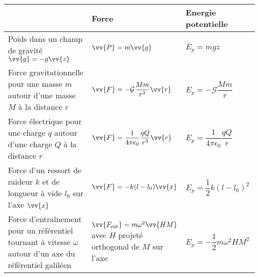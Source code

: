 \documentclass[a4paper]{article}
\begin{document}
\pagestyle{fancy}
\fancyhf{}
\setlength{\headheight}{15pt}

\begin{center}
	\large{}
\end{center}


\setlength{\tabcolsep}{10pt}
\renewcommand{\arraystretch}{1.5}
\begin{table}[h]
\begin{tabular}{p{0.4\linewidth}|p{0.3\linewidth}|p{0.3\linewidth}} 
                       & Force & Energie potentielle \\ \hline
Poids dans un champ de gravité \(\vv{g}=-g\vv{z}\)    &  \(\vv{P}=m\vv{g}\)     &    \(E_p=mgz\)                 \\
Force gravitationnelle pour une masse \(m\) autour d'une masse \(M\) à la distance \(r\)&\(\vv{F}=-\mathcal{G}\dfrac{Mm}{r^3}\vv{r} \)      &       \(E_p=    -\mathcal{G}\dfrac{Mm}{r}   \)       \\
Force électrique pour une charge \(q\) autour d'une charge \(Q\) à la distance \(r\)      &\(\vv{F}=\dfrac{1}{4\pi\epsilon_0}\dfrac{qQ}{r^3}\vv{r}\)       &\(E_p=\dfrac{1}{4\pi\epsilon_0}\dfrac{qQ}{r}\)\\
Force d'un ressort de raideur \(k\) et de longueur à vide \(l_0\) sur l'axe \(\vv{x}\)   &\(\vv{F}=-k(l-l_0)\vv{x}\)       & \(E_p=\dfrac{1}{2}k(l-l_0)^2\)                    \\
Force d'entraînement pour un référentiel tournant à vitesse \(\omega\) autour d'un axe du référentiel galiléen   &\(\vv{F_{\mathrm{ent}}}=m\omega^2\vv{HM}\) avec \(H\) projeté orthogonal de \(M\) sur l'axe       &   \(E_p=-\dfrac{1}{2}m\omega^2HM^2\)                 
\end{tabular}
\end{table}
\end{document}
